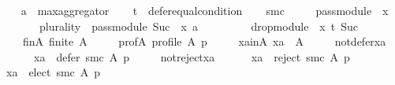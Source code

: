 \begin{isabellebody}
\ \ \isamarkupfalse%
\ {\isacharquery}{\kern0pt}a\ {\isacharequal}{\kern0pt}\ {\isachardoublequoteopen}max{\isacharunderscore}{\kern0pt}aggregator{\isachardoublequoteclose}\isanewline
\ \ \isamarkupfalse%
\ {\isacharquery}{\kern0pt}t\ {\isacharequal}{\kern0pt}\ {\isachardoublequoteopen}defer{\isacharunderscore}{\kern0pt}equal{\isacharunderscore}{\kern0pt}condition{\isachardoublequoteclose}\isanewline
\ \ \isamarkupfalse%
\ {\isacharquery}{\kern0pt}smc\ {\isacharequal}{\kern0pt}\isanewline
\ \ \ \ {\isachardoublequoteopen}pass{\isacharunderscore}{\kern0pt}module\ {}\ x\ {\isasymtriangleright}\isanewline
\ \ \ \ \ \ \ {\isacharparenleft}{\kern0pt}{\isacharparenleft}{\kern0pt}plurality{\isasymdown}{\isacharparenright}{\kern0pt}\ {\isasymtriangleright}\ pass{\isacharunderscore}{\kern0pt}module\ {\isacharparenleft}{\kern0pt}Suc\ {}{\isacharparenright}{\kern0pt}\ x{\isacharparenright}{\kern0pt}\ {\isasymparallel}\isactrlsub {\isacharquery}{\kern0pt}a\isanewline
\ \ \ \ \ \ \ \ \ drop{\isacharunderscore}{\kern0pt}module\ {}\ x\ {\isasymcirclearrowleft}\isactrlsub {\isacharquery}{\kern0pt}t\ {\isacharparenleft}{\kern0pt}Suc\ {}{\isacharparenright}{\kern0pt}{\isachardoublequoteclose}\isanewline
\ \ \isamarkupfalse%
\isanewline
\ \ \ \ fin{\isacharunderscore}{\kern0pt}A{\isacharcolon}{\kern0pt}\ {\isachardoublequoteopen}finite\ A{\isachardoublequoteclose}\ \isanewline
\ \ \ \ prof{\isacharunderscore}{\kern0pt}A{\isacharcolon}{\kern0pt}\ {\isachardoublequoteopen}profile\ A\ p{\isachardoublequoteclose}\ \isanewline
\ \ \ \ xa{\isacharunderscore}{\kern0pt}in{\isacharunderscore}{\kern0pt}A{\isacharcolon}{\kern0pt}\ {\isachardoublequoteopen}xa\ {\isasymin}\ A{\isachardoublequoteclose}\ \isanewline
\ \ \ \ not{\isacharunderscore}{\kern0pt}defer{\isacharunderscore}{\kern0pt}xa{\isacharcolon}{\kern0pt}\isanewline
\ \ \ \ \ \ {\isachardoublequoteopen}xa\ {\isasymnotin}\ defer\ {\isacharparenleft}{\kern0pt}{\isacharquery}{\kern0pt}smc{\isacharparenright}{\kern0pt}\ A\ p{\isachardoublequoteclose}\ \isanewline
\ \ \ \ not{\isacharunderscore}{\kern0pt}reject{\isacharunderscore}{\kern0pt}xa{\isacharcolon}{\kern0pt}\isanewline
\ \ \ \ \ \ {\isachardoublequoteopen}xa\ {\isasymnotin}\ reject\ {\isacharparenleft}{\kern0pt}{\isacharquery}{\kern0pt}smc{\isacharparenright}{\kern0pt}\ A\ p{\isachardoublequoteclose}\isanewline
\ \ \isamarkupfalse%
\ {\isachardoublequoteopen}xa\ {\isasymin}\ elect\ {\isacharparenleft}{\kern0pt}{\isacharquery}{\kern0pt}smc{\isacharparenright}{\kern0pt}\ A\ p{\isachardoublequoteclose}\isanewline

\end{isabellebody}
